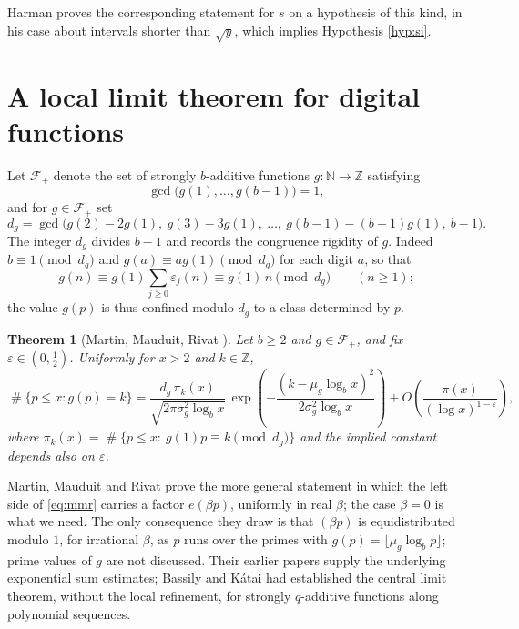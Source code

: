\documentclass[11pt,reqno]{amsart}
\theoremstyle{plain}
\newtheorem{theorem}{Theorem}[section]
\theoremstyle{definition}
\newcommand{\N}{\mathbb{N}}
\newcommand{\Z}{\mathbb{Z}}
\DeclareMathOperator{\Card}{\#}
\begin{document}
Harman \cite[Theorem 6]{harman} proves the corresponding statement for $s$ on a hypothesis of this kind, in his case about intervals shorter than $\sqrt y$, which implies Hypothesis \ref{hyp:si}.

\section{A local limit theorem for digital functions}\label{sec:mmr}

Let $\mathcal F_+$ denote the set of strongly $b$-additive functions $g\colon\N\to\Z$ satisfying
\begin{equation}\label{eq:gcd}
\gcd\big(g(1),\dots,g(b-1)\big)=1,
\end{equation}
and for $g\in\mathcal F_+$ set
\begin{equation}\label{eq:dg}
d_g=\gcd\big(g(2)-2g(1),\ g(3)-3g(1),\ \dots,\ g(b-1)-(b-1)g(1),\ b-1\big).
\end{equation}
The integer $d_g$ divides $b-1$ and records the congruence rigidity of $g$. Indeed $b\equiv1\pmod{d_g}$ and $g(a)\equiv ag(1)\pmod{d_g}$ for each digit $a$, so that
\[
g(n)\equiv g(1)\sum_{j\ge0}\varepsilon_j(n)\equiv g(1)\,n \pmod{d_g}\qquad (n\ge1);
\]
the value $g(p)$ is thus confined modulo $d_g$ to a class determined by $p$.

\begin{theorem}[Martin, Mauduit, Rivat {\cite[Th\'eor\`eme 1]{mmr2019}}]\label{thm:mmr}
Let $b\ge2$ and $g\in\mathcal F_+$, and fix $\varepsilon\in(0,\tfrac12)$. Uniformly for $x>2$ and $k\in\Z$,
\begin{equation}\label{eq:mmr}
\Card\{p\le x: g(p)=k\}
=\frac{d_g\,\pi_k(x)}{\sqrt{2\pi\sigma_g^{2}\log_b x}}\,
\exp\left(-\frac{(k-\mu_g\log_b x)^{2}}{2\sigma_g^{2}\log_b x}\right)
+O\!\left(\frac{\pi(x)}{(\log x)^{1-\varepsilon}}\right),
\end{equation}
where $\pi_k(x)=\Card\{p\le x:\ g(1)p\equiv k \!\!\pmod{d_g}\}$ and the implied constant depends also on $\varepsilon$.
\end{theorem}

Martin, Mauduit and Rivat prove the more general statement in which the left side of \eqref{eq:mmr} carries a factor $e(\beta p)$, uniformly in real $\beta$; the case $\beta=0$ is what we need. The only consequence they draw is that $(\beta p)$ is equidistributed modulo $1$, for irrational $\beta$, as $p$ runs over the primes with $g(p)=\lfloor\mu_g\log_b p\rfloor$; prime values of $g$ are not discussed. Their earlier papers \cite{mmr2014,mmr2015} supply the underlying exponential sum estimates; Bassily and K\'atai \cite{bassilykatai} had established the central limit theorem, without the local refinement, for strongly $q$-additive functions along polynomial sequences.
\end{document}
